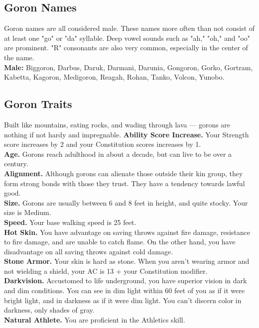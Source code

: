 \documentclass[10pt,twoside,twocolumn,openany]{book}
\begin{document}
\subsection{Goron Names}
Goron names are all considered male. These names more often than not consist of at least one "go" or "da" syllable. Deep vowel sounds such as "ah," "oh," and "oo" are prominent. "R" consonants are also very common, especially in the center of the name. \\
\textbf{Male:} Biggoron, Darbus, Daruk, Darmani, Darunia, Gongoron, Gorko, Gortram, Kabetta, Kagoron, Medigoron, Reagah, Rohan, Tanko, Volcon, Yunobo. 

\subsection{Goron Traits}
Built like mountains, eating rocks, and wading through lava — gorons are nothing if not hardy and impregnable.
\indent \textbf{Ability Score Increase.} Your Strength score increases by 2 and your Constitution scores increases by 1.\\
\indent \textbf{Age.} Gorons reach adulthood in about a decade, but can live to be over a century. \\
\indent \textbf{Alignment.} Although gorons can alienate those outside their kin group, they form strong bonds with those they trust. They have a tendency towards lawful good.\\
\indent \textbf{Size.} Gorons are usually between 6 and 8 feet in height, and quite stocky. Your size is Medium.\\
\indent \textbf{Speed.} Your base walking speed is 25 feet.\\
\indent \textbf{Hot Skin.} You have advantage on saving throws against fire damage, resistance to fire damage, and are unable to catch flame. On the other hand, you have disadvantage on all saving throws against cold damage.\\
\indent \textbf{Stone Armor.} Your skin is hard as stone. When you aren’t wearing armor and not wielding a shield, your AC is 13 + your Constitution modifier.\\
\indent \textbf{Darkvision.} Accustomed to life underground, you have superior vision in dark and dim conditions. You can see in dim light within 60 feet of you as if it were bright light, and in darkness as if it were dim light. You can’t discern color in darkness, only shades of gray.\\
\indent \textbf{Natural Athlete.} You are proficient in the Athletics skill.\\
\end{document}
